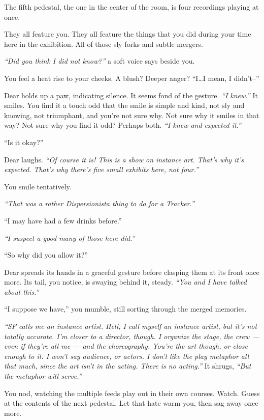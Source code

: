 The fifth pedestal, the one in the center of the room, is four recordings playing at once.

They all feature you. They all feature the things that you did during your time here in the exhibition. All of those sly forks and subtle mergers.

\emph{``Did you think I did not know?''} a soft voice says beside you.

You feel a heat rise to your cheeks. A blush? Deeper anger? ``I\ldots{}I mean, I didn't--''

Dear holds up a paw, indicating silence. It seems fond of the gesture. \emph{``I knew.''} It smiles. You find it a touch odd that the smile is simple and kind, not sly and knowing, not triumphant, and you're not sure why. Not sure why it smiles in that way? Not sure why you find it odd? Perhaps both. \emph{``I knew and expected it.''}

``Is it okay?''

Dear laughs. \emph{``Of course it is! This is a show on instance art. That's why it's expected. That's why there's five small exhibits here, not four.''}

You smile tentatively.

\emph{``That was a rather Dispersionista thing to do for a Tracker.''}

``I may have had a few drinks before.''

\emph{``I suspect a good many of those here did.''}

``So why did you allow it?''

Dear spreads its hands in a graceful gesture before clasping them at its front once more. Its tail, you notice, is swaying behind it, steady. \emph{``You and I have talked about this.''}

``I suppose we have,'' you mumble, still sorting through the merged memories.

\emph{``SF calls me an instance artist. Hell, I call myself an instance artist, but it's not totally accurate. I'm closer to a director, though. I organize the stage, the crew --- even if they're all me --- and the choreography. You're the art though, or close enough to it. I won't say audience, or actors. I don't like the play metaphor all that much, since the art isn't in the acting. There is no acting.''}  It shrugs, \emph{``But the metaphor will serve.''}

You nod, watching the multiple feeds play out in their own courses. Watch. Guess at the contents of the next pedestal. Let that hate warm you, then sag away once more.

